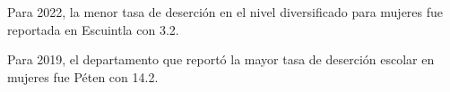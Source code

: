 \justifying Para 2022, la menor tasa de deserción en el nivel diversificado para mujeres fue reportada en Escuintla con 3.2. 

Para 2019, el departamento que reportó la mayor tasa de deserción escolar en mujeres fue Péten con 14.2.  

